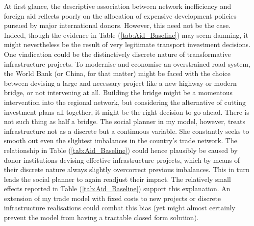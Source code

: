 \documentclass[11pt, oneside]{article}   	%
\let\oldref\ref
\renewcommand{\ref}[1]{(\oldref{#1})}
\begin{document}
At first glance, the descriptive association between network inefficiency and foreign aid reflects poorly on the allocation of expensive development policies pursued by major international donors. However, this need not be the case. Indeed, though the evidence in Table \ref{tab:Aid_Baseline} may seem damning, it might nevertheless be the result of very legitimate transport investment decisions. One vindication could be the distinctively discrete nature of transformative infrastructure projects. To modernise and economise an overstrained road system, the World Bank (or China, for that matter) might be faced with the choice between devising a large and necessary project like a new highway or modern bridge, or not intervening at all. Building the bridge might be a momentous intervention into the regional network, but considering the alternative of cutting investment plans all together, it might be the right decision to go ahead. There is not such thing as half a bridge. The social planner in my model, however, treats infrastructure not as a discrete but a continuous variable. She constantly seeks to smooth out even the slightest imbalances in the country's trade network. The relationship in Table \ref{tab:Aid_Baseline} could hence plausibly be caused by donor institutions devising effective infrastructure projects, which by means of their discrete nature always slightly overcorrect previous imbalances. This in turn leads the social planner to again readjust their impact. The relatively small effects reported in Table \ref{tab:Aid_Baseline} support this explanation. An extension of my trade model with fixed costs to new projects or discrete infrastructure realisations could combat this bias (yet might almost certainly prevent the model from having a tractable closed form solution).
\end{document}
